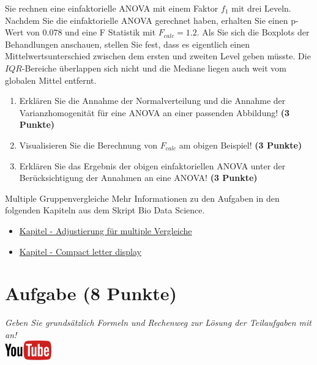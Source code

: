 \documentclass[a4paper, 9pt]{scrartcl}\usepackage[]{graphicx}\usepackage[]{xcolor}
\begin{document}
Sie rechnen eine einfaktorielle ANOVA mit einem Faktor $f_1$ mit
drei Leveln. Nachdem Sie die einfaktorielle ANOVA gerechnet
haben, erhalten Sie einen p-Wert von $0.078$ und eine F Statistik mit
$F_{calc} = 1.2$. Als Sie sich die Boxplots der Behandlungen anschauen,
stellen Sie fest, dass es eigentlich einen Mittelwertsunterschied zwischen
dem ersten und zweiten Level geben m{\"u}sste. Die
$IQR$-Bereiche {\"u}berlappen sich nicht und die Mediane liegen auch weit vom
globalen Mittel entfernt.


\begin{enumerate}
\item Erkl{\"a}ren Sie die Annahme der Normalverteilung und die Annahme der
  Varianzhomogenit{\"a}t f{\"u}r eine ANOVA an einer passenden Abbildung! \textbf{(3 Punkte)}
\item Visualisieren Sie die Berechnung von $F_{calc}$ am obigen Beispiel!
  \textbf{(3 Punkte)}
\item Erkl{\"a}ren Sie das Ergebnis der obigen einfaktoriellen ANOVA unter der
  Ber{\"u}cksichtigung der Annahmen an eine ANOVA! \textbf{(3 Punkte)}
\end{enumerate}

 
\clearpage
\begin{graybox}{Multiple Gruppenvergleiche}
Mehr Informationen zu den Aufgaben in den folgenden Kapiteln aus dem Skript Bio Data Science.
  \begin{itemize}
  \item \href{https://jkruppa.github.io/stat-tests-theorie.html}{Kapitel - Adjustierung für multiple Vergleiche}
  \item \href{https://jkruppa.github.io/stat-tests-posthoc.html}{Kapitel - Compact letter display}
  \end{itemize}
\end{graybox}
\clearpage

\section{Aufgabe \hfill (8 Punkte)}

\textit{Geben Sie grunds{\"a}tzlich Formeln und Rechenweg zur L{\"o}sung der
  Teilaufgaben mit an!} \\[1Ex]

 \hfill\href{https://youtu.be/hr_jPd1hpKY}{\includegraphics[width =
   2cm]{img/youtube}}\\[1Ex]
\end{document}

